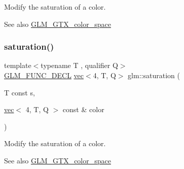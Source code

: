 Modify the saturation of a color. \begin{DoxySeeAlso}{See also}
\hyperlink{group__gtx__color__space}{G\+L\+M\+\_\+\+G\+T\+X\+\_\+color\+\_\+space} 
\end{DoxySeeAlso}
\mbox{\label{group__gtx__color__space_gaba0eacee0736dae860e9371cc1ae4785}} 
\subsubsection{\texorpdfstring{saturation()}{saturation()}\hspace{0.1cm}{\footnotesize\ttfamily [3/3]}}
{\footnotesize\ttfamily template$<$typename T , qualifier Q$>$ \\
\hyperlink{setup_8hpp_ab2d052de21a70539923e9bcbf6e83a51}{G\+L\+M\+\_\+\+F\+U\+N\+C\+\_\+\+D\+E\+CL} \hyperlink{structglm_1_1vec}{vec}$<$4, T, Q$>$ glm\+::saturation (\begin{DoxyParamCaption}\item[{T const}]{s,  }\item[{\hyperlink{structglm_1_1vec}{vec}$<$ 4, T, Q $>$ const \&}]{color }\end{DoxyParamCaption})}

Modify the saturation of a color. \begin{DoxySeeAlso}{See also}
\hyperlink{group__gtx__color__space}{G\+L\+M\+\_\+\+G\+T\+X\+\_\+color\+\_\+space} 
\end{DoxySeeAlso}
